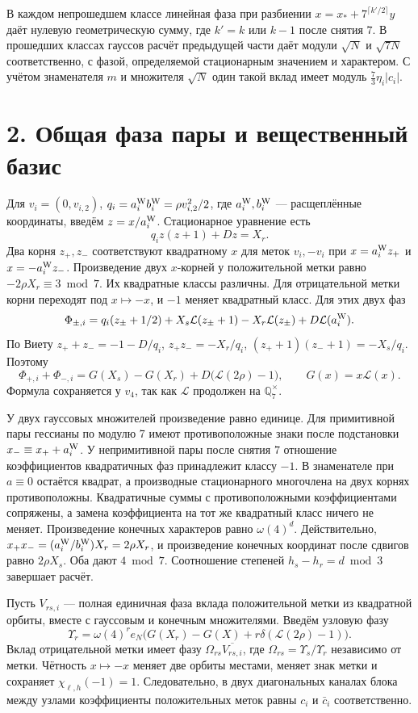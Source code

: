 \documentclass[11pt,a4paper]{article}
\newcommand{\sect}[1]{\section*{\sffamily\color{ink}#1}}
\newcommand{\Qp}{\mathbb Q_7}
\begin{document}
В каждом непрошедшем классе линейная фаза при разбиении \(x=x_*+7^{\lceil k'/2\rceil}y\) даёт нулевую геометрическую сумму, где \(k'=k\) или \(k-1\) после снятия \(7\). В прошедших классах гауссов расчёт предыдущей части даёт модули \(\sqrt N\) и \(\sqrt{7N}\) соответственно, с фазой, определяемой стационарным значением и характером. С учётом знаменателя \(m\) и множителя \(\sqrt N\) один такой вклад имеет модуль \(\tfrac73\eta_i|c_i|\).
\newpage
\sect{2. Общая фаза пары и вещественный базис}
Для \(v_i=(0,v_{i,2})\), \(q_i=a_i^{\rm W}b_i^{\rm W}=\rho v_{i,2}^2/2\), где \(a_i^{\rm W},b_i^{\rm W}\) --- расщеплённые координаты, введём \(z=x/a_i^{\rm W}\). Стационарное уравнение есть
\[
           q_i z(z+1)+D z=X_r.
\]
Два корня \(z_+,z_-\) соответствуют квадратному \(x\) для меток \(v_i,-v_i\) при \(x=a_i^{\rm W}z_+\) и \(x=-a_i^{\rm W}z_-\). Произведение двух \(x\)-корней у положительной метки равно \(-2\rho X_r\equiv3\bmod7\). Их квадратные классы различны. Для отрицательной метки корни переходят под \(x\mapsto-x\), и \(-1\) меняет квадратный класс. Для этих двух фаз
\[
 \Phi_{\pm,i}=q_i(z_\pm+1/2)+X_s\mathcal L(z_\pm+1)-X_r\mathcal L(z_\pm)
                         + D\mathcal L(a_i^{\rm W}).
\]
По Виету \(z_++z_-=-1-D/q_i\), \(z_+z_-=-X_r/q_i\), \((z_++1)(z_-+1)=-X_s/q_i\). Поэтому
\begin{equation}
   \Phi_{+,i}+\Phi_{-,i}
      =G(X_s)-G(X_r)+D\bigl(\mathcal L(2\rho)-1\bigr),
             \qquad G(x)=x\mathcal L(x).
                                                               \tag{1}
\end{equation}
Формула сохраняется у \(v_4\), так как \(\mathcal L\) продолжен на \(\Qp^\times\).

У двух гауссовых множителей произведение равно единице. Для примитивной пары гессианы по модулю 7 имеют противоположные знаки после подстановки \(x_-\equiv x_++a_i^{\rm W}\). У непримитивной пары после снятия \(7\) отношение коэффициентов квадратичных фаз принадлежит классу \(-1\). В знаменателе при \(a\equiv0\) остаётся квадрат, а производные стационарного многочлена на двух корнях противоположны. Квадратичные суммы с противоположными коэффициентами сопряжены, а замена коэффициента на тот же квадратный класс ничего не меняет. Произведение конечных характеров равно \(\omega(4)^d\). Действительно, \(x_+x_-=(a_i^{\rm W}/b_i^{\rm W})X_r=2\rho X_r\), и произведение конечных координат после сдвигов равно \(2\rho X_s\). Оба дают \(4\bmod7\). Соотношение степеней \(h_s-h_r=d\bmod3\) завершает расчёт.

Пусть \(V_{rs,i}\) --- полная единичная фаза вклада положительной метки из квадратной орбиты, вместе с гауссовым и конечным множителями. Введём узловую фазу
\[
   \Upsilon_r=\omega(4)^r e_N\!\bigl(G(X_r)-G(X)+r\delta(\mathcal L(2\rho)-1)\bigr).
\]
Вклад отрицательной метки имеет фазу \(\Omega_{rs}\overline{V_{rs,i}}\), где \(\Omega_{rs}=\Upsilon_s/\Upsilon_r\) независимо от метки. Чётность \(x\mapsto-x\) меняет две орбиты местами, меняет знак метки и сохраняет \(\chi_{\ell,h}(-1)=1\). Следовательно, в двух диагональных каналах блока между узлами коэффициенты положительных меток равны \(c_i\) и \(\bar c_i\) соответственно.
\end{document}
